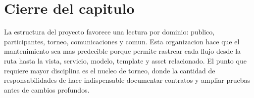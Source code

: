 \section{Cierre del capitulo}
\label{sec:estructura-cierre}

La estructura del proyecto favorece una lectura por dominio: publico, participantes, torneo, comunicaciones y comun. Esta organizacion hace que el mantenimiento sea mas predecible porque permite rastrear cada flujo desde la ruta hasta la vista, servicio, modelo, template y asset relacionado. El punto que requiere mayor disciplina es el nucleo de torneo, donde la cantidad de responsabilidades de  hace indispensable documentar contratos y ampliar pruebas antes de cambios profundos.
